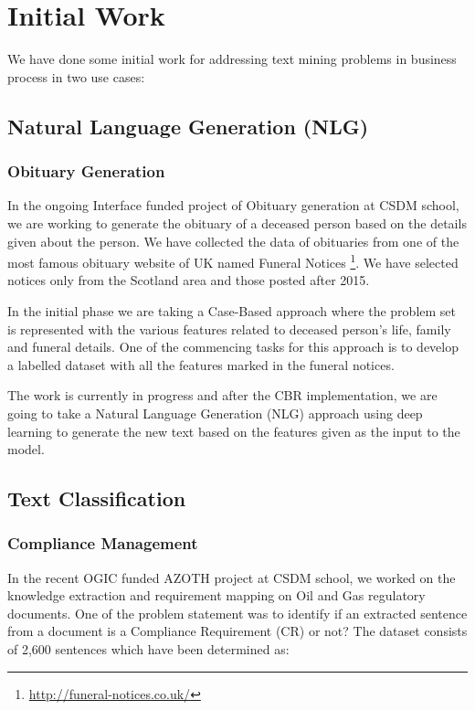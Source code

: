 \section{Initial Work}\label{sec:initial_work}
We have done some initial work for addressing text mining problems in business process in two use cases:

\subsection{Natural Language Generation (NLG)}

\subsubsection{Obituary Generation}
In the ongoing Interface funded project of Obituary generation at CSDM school, we are working to generate the obituary of a deceased person based on the details given about the person. We have collected the data of obituaries from one of the most famous obituary website of UK named Funeral Notices \footnote{\url{http://funeral-notices.co.uk/}}. We have selected notices only from the Scotland area and those posted after 2015. 

In the initial phase we are taking a Case-Based approach where the problem set is represented with the various features related to deceased person's life, family and funeral details. One of the commencing tasks for this approach is to develop a labelled dataset with all the features marked in the funeral notices. 

The work is currently in progress and after the CBR implementation, we are going to take a Natural Language Generation (NLG) approach using deep learning to generate the new text based on the features given as the input to the model. 

\subsection{Text Classification}

\subsubsection{Compliance Management}
In the recent OGIC funded AZOTH project at CSDM school, we worked on the knowledge extraction and requirement mapping on Oil and Gas regulatory documents. One of the problem statement was to identify if an extracted sentence from a document is a Compliance Requirement (CR) or not? The dataset consists of 2,600 sentences which have been determined as: 


